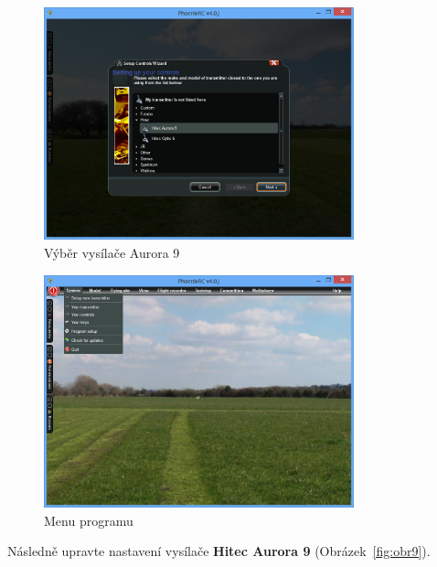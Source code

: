 \documentclass[11pt, a4paper]{article}
\begin{document}
\begin{figure}[h]
\begin{center}
\includegraphics[width=0.8\textwidth]{fig/7.PNG}
\caption{Výběr vysílače Aurora 9}
\label{fig:obr7}
\end{center}
\end{figure}

\begin{figure}[h]
\begin{center}
\includegraphics[width=0.8\textwidth]{fig/8.PNG}
\caption{Menu programu}
\label{fig:obr8}
\end{center}
\end{figure}

Následně upravte nastavení vysílače \textbf{Hitec Aurora 9} (Obrázek~\ref{fig:obr9}).
\end{document}
